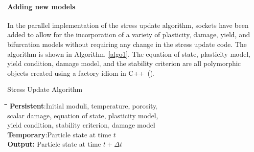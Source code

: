 \paragraph{Adding new models}
  In the parallel implementation of the stress update algorithm, sockets have
  been added to allow for the incorporation of a variety of plasticity, damage,
  yield, and bifurcation models without requiring any change in the stress
  update code.  The algorithm is shown in Algorithm~\ref{algo1}.  The
  equation of state, plasticity model, yield condition, damage model, and
  the stability criterion are all polymorphic objects created using a
  factory idiom in C++~(\cite{Coplien92}).
  \begin{table}[p]
    \caption{Stress Update Algorithm} \label{algo1}
    \vspace{12pt}
    \begin{tabbing}
    \quad \=\quad \=\quad \=\quad \=\quad \kill
    {\bf Persistent}:Initial moduli, temperature, porosity, \\
      \>\>        scalar damage, equation of state, plasticity model, \\
      \>\>        yield condition, stability criterion, damage model\\
    {\bf Temporary}:Particle state at time $t$ \\
    {\bf Output:} Particle state at time $t+\Delta t$\\ \\


\end{tabbing}
\end{table}
